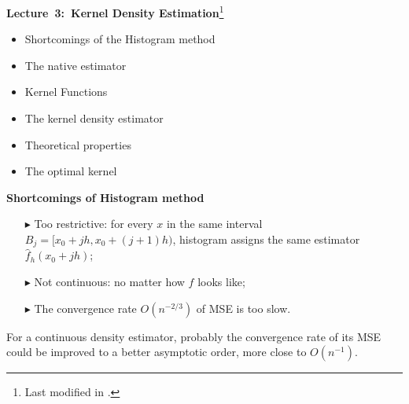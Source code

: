 \documentclass[19pt,landscape]{article}
\begin{document}
%


%

\newpage
{\LARGE\centerline{\textbf{Lecture~3:~Kernel Density Estimation}\footnote{Last modified in .}}}
\vskip25pt
\begin{minipage}{.9\textwidth}
    \Large
\begin{itemize}
\item Shortcomings of the Histogram method
\item The native estimator
\item Kernel Functions  
\item The kernel density estimator
\item Theoretical properties 
\item The optimal kernel

\end{itemize}
\end{minipage}
\newpage
{\Large\centerline{\textbf{Shortcomings of Histogram method}}}
\vskip25pt
\begin{minipage}{.9\textwidth}
    \Large
\begin{itemize}
    \item[$\blacktriangleright$] Too restrictive: for every $x$ in the same interval $B_j=[x_0+jh, x_0+(j+1)h)$, histogram assigns the same estimator $\hat{f}_h(x_0+jh)$;
    \item[$\blacktriangleright$] Not continuous: no matter how $f$ looks like;
    \item[$\blacktriangleright$] The convergence rate $O(n^{-2/3})$ of MSE is too slow.  
\end{itemize}
For a continuous density estimator, probably the convergence rate of its MSE could be improved to a better asymptotic order, more close to $O(n^{-1})$.
\end{minipage}
\end{document}
